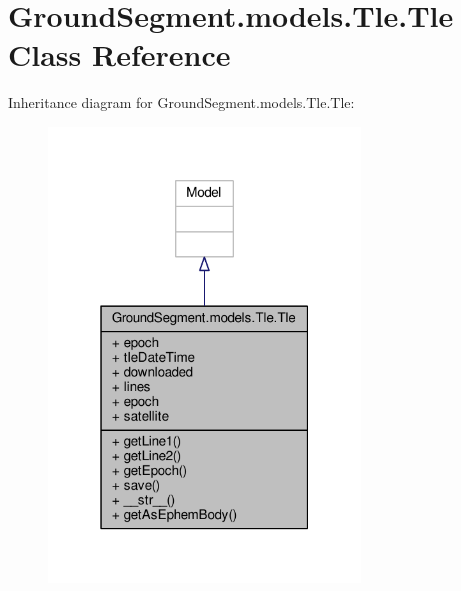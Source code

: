 \hypertarget{class_ground_segment_1_1models_1_1_tle_1_1_tle}{}\section{Ground\+Segment.\+models.\+Tle.\+Tle Class Reference}
\label{class_ground_segment_1_1models_1_1_tle_1_1_tle}


Inheritance diagram for Ground\+Segment.\+models.\+Tle.\+Tle\+:\nopagebreak
\begin{figure}[H]
\begin{center}
\leavevmode
\includegraphics[width=235pt]{class_ground_segment_1_1models_1_1_tle_1_1_tle__inherit__graph}
\end{center}
\end{figure}


